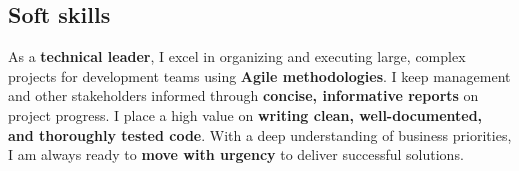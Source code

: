 \documentclass[letterpaper]{soragna-onepage-twocols} %
\begin{document}
\begin{minipage}[t]{0.3\textwidth}
\subsection{Soft skills}

As a \textbf{technical leader}, I excel in organizing and executing large, complex projects for development teams using \textbf{Agile methodologies}.
I keep management and other stakeholders informed through \textbf{concise, informative reports} on project progress.
I place a high value on \textbf{writing clean, well-documented, and thoroughly tested code}.
With a deep understanding of business priorities, I am always ready to \textbf{move with urgency} to deliver successful solutions.


\end{minipage} %
\hfill
%
%
%
%
\end{document}

